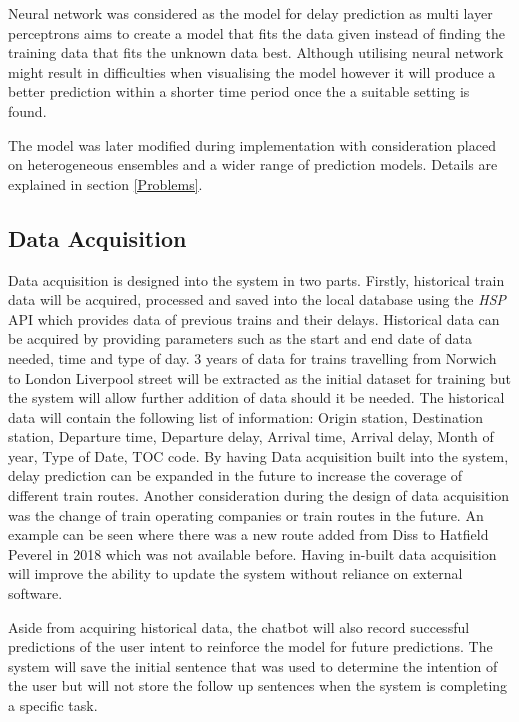 \documentclass[11pt]{article}
\begin{document}
Neural network was considered as the model for delay prediction as multi layer perceptrons aims to create a model that fits the data given instead of finding the training data that fits the unknown data best. Although utilising neural network might result in difficulties when visualising the model however it will produce a better prediction within a shorter time period once the a suitable setting is found.

The model was later modified during implementation with consideration placed on heterogeneous ensembles and a wider range of prediction models. Details are explained in section \ref{Problems}.

\subsection{Data Acquisition}
Data acquisition is designed into the system in two parts. Firstly, historical train data will be acquired, processed and saved into the local database using the \textit{HSP} API which provides data of previous trains and their delays. Historical data can be acquired by providing parameters such as the start and end date of data needed, time and type of day. 3 years of data for trains travelling from Norwich to London Liverpool street will be extracted as the initial dataset for training but the system will allow further addition of data should it be needed. The historical data will contain the following list of information: Origin station, Destination station, Departure time, Departure delay, Arrival time, Arrival delay, Month of year, Type of Date, TOC code. By having Data acquisition built into the system, delay prediction can be expanded in the future to increase the coverage of different train routes. Another consideration during the design of data acquisition was the change of train operating companies or train routes in the future. An example can be seen where there was a new route added from Diss to Hatfield Peverel in 2018 which was not available before. Having in-built data acquisition will improve the ability to update the system without reliance on external software.

Aside from acquiring historical data, the chatbot will also record successful predictions of the user intent to reinforce the model for future predictions. The system will save the initial sentence that was used to determine the intention of the user but will not store the follow up sentences when the system is completing a specific task.
\end{document}
